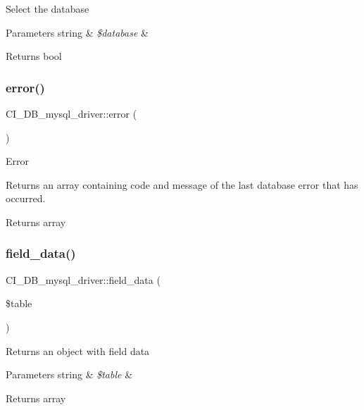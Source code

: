 Select the database


\begin{DoxyParams}[1]{Parameters}
string & {\em \$database} & \\
\hline
\end{DoxyParams}
\begin{DoxyReturn}{Returns}
bool 
\end{DoxyReturn}
\mbox{\label{class_c_i___d_b__mysql__driver_a36e98a313e685ab9ef489b38946f1a52}} 
\subsubsection{\texorpdfstring{error()}{error()}}
{\footnotesize\ttfamily C\+I\+\_\+\+D\+B\+\_\+mysql\+\_\+driver\+::error (\begin{DoxyParamCaption}{ }\end{DoxyParamCaption})}

Error

Returns an array containing code and message of the last database error that has occurred.

\begin{DoxyReturn}{Returns}
array 
\end{DoxyReturn}
\mbox{\label{class_c_i___d_b__mysql__driver_af29e284d91510dbbdd858e69dced2636}} 
\subsubsection{\texorpdfstring{field\+\_\+data()}{field\_data()}}
{\footnotesize\ttfamily C\+I\+\_\+\+D\+B\+\_\+mysql\+\_\+driver\+::field\+\_\+data (\begin{DoxyParamCaption}\item[{}]{\$table }\end{DoxyParamCaption})}

Returns an object with field data


\begin{DoxyParams}[1]{Parameters}
string & {\em \$table} & \\
\hline
\end{DoxyParams}
\begin{DoxyReturn}{Returns}
array 
\end{DoxyReturn}
\mbox{\label{class_c_i___d_b__mysql__driver_ae0b4206f790de276d05fb6f8f20a1556}} 
